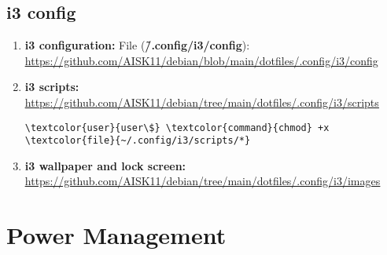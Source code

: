 \documentclass[10pt, a4paper, onecolumn, openany]{book} %
\begin{document}
\section{i3 config}
\begin{enumerate}
    \item \textbf{i3 configuration:}
\newline File (\textbf{\textcolor{file}{\~/.config/i3/config}}):
\newline \underline{\url{https://github.com/AISK11/debian/blob/main/dotfiles/.config/i3/config}}
    \item \textbf{i3 scripts:}
\newline \underline{\url{https://github.com/AISK11/debian/tree/main/dotfiles/.config/i3/scripts}}
\begin{Verbatim}[commandchars=\\\{\}]
\textcolor{user}{user\$} \textcolor{command}{chmod} +x \textcolor{file}{~/.config/i3/scripts/*}
\end{Verbatim}
    \item \textbf{i3 wallpaper and lock screen:}
\newline \underline{\url{https://github.com/AISK11/debian/tree/main/dotfiles/.config/i3/images}}
\end{enumerate}
\chapter{Power Management}
\end{document}
